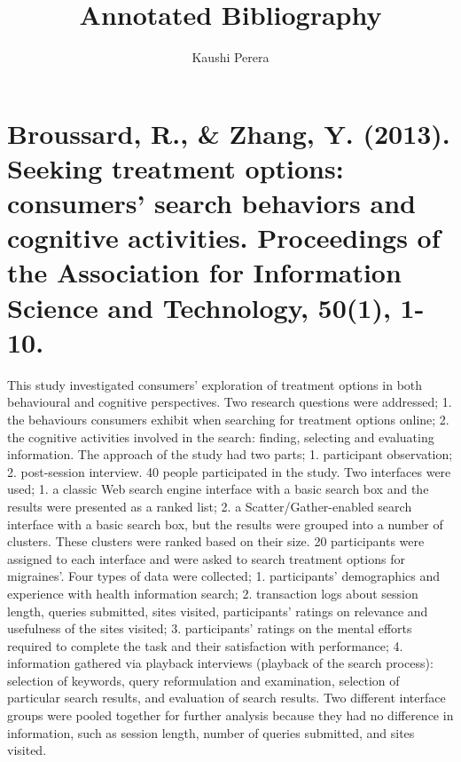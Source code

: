 \documentclass[]{article}
\title{Annotated Bibliography}
\author{Kaushi Perera}
\begin{document}
	
\maketitle

\section{Broussard, R., \& Zhang, Y. (2013). Seeking treatment options: consumers' search behaviors and cognitive activities. Proceedings of the Association for Information Science and Technology, 50(1), 1-10.} 

This study investigated consumers’ exploration of treatment options in both behavioural and cognitive perspectives. Two research questions were addressed; 1. the behaviours consumers exhibit when searching for treatment options online; 2. the cognitive activities involved in the search: finding, selecting and evaluating information. The approach of the study had two parts; 1. participant observation; 2. post-session interview. 40 people participated in the study. Two interfaces were used; 1. a classic Web search engine interface with a basic search box and the results were presented as a ranked list; 2. a Scatter/Gather-enabled search interface with a basic search box, but the results were grouped into a number of clusters. These clusters were ranked based on their size. 20 participants were assigned to each interface and were asked to search treatment options for migraines’. Four types of data were collected; 1. participants’ demographics and experience with health information search; 2. transaction logs about session length, queries submitted, sites visited, participants’ ratings on relevance and usefulness of the sites visited; 3. participants’ ratings on the mental efforts required to complete the task and their satisfaction with performance; 4. information gathered via playback interviews (playback of the search process): selection of keywords, query reformulation and examination, selection of particular search results, and evaluation of search results. Two different interface groups were pooled together for further analysis because they had no difference in information, such as session length, number of queries submitted, and sites visited.                       
\end{document}
